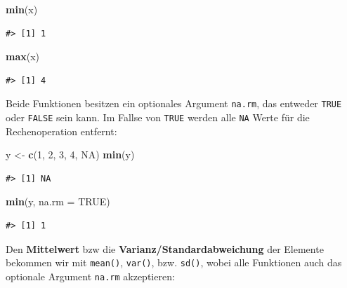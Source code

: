 \documentclass[]{tufte-book}
\newenvironment{Shaded}{}{}
\newcommand{\KeywordTok}[1]{\textcolor[rgb]{0.00,0.44,0.13}{\textbf{#1}}}
\newcommand{\DataTypeTok}[1]{\textcolor[rgb]{0.56,0.13,0.00}{#1}}
\newcommand{\DecValTok}[1]{\textcolor[rgb]{0.25,0.63,0.44}{#1}}
\newcommand{\StringTok}[1]{\textcolor[rgb]{0.25,0.44,0.63}{#1}}
\newcommand{\OtherTok}[1]{\textcolor[rgb]{0.00,0.44,0.13}{#1}}
\newcommand{\NormalTok}[1]{#1}
\begin{document}
\begin{Shaded}
\begin{Highlighting}[]
\KeywordTok{min}\NormalTok{(x)}
\end{Highlighting}
\end{Shaded}

\begin{verbatim}
#> [1] 1
\end{verbatim}

\begin{Shaded}
\begin{Highlighting}[]
\KeywordTok{max}\NormalTok{(x)}
\end{Highlighting}
\end{Shaded}

\begin{verbatim}
#> [1] 4
\end{verbatim}

Beide Funktionen besitzen ein optionales Argument \texttt{na.rm}, das
entweder \texttt{TRUE} oder \texttt{FALSE} sein kann. Im Fallse von
\texttt{TRUE} werden alle \texttt{NA} Werte für die Rechenoperation
entfernt:

\begin{Shaded}
\begin{Highlighting}[]
\NormalTok{y <-}\StringTok{ }\KeywordTok{c}\NormalTok{(}\DecValTok{1}\NormalTok{, }\DecValTok{2}\NormalTok{, }\DecValTok{3}\NormalTok{, }\DecValTok{4}\NormalTok{, }\OtherTok{NA}\NormalTok{)}
\KeywordTok{min}\NormalTok{(y)}
\end{Highlighting}
\end{Shaded}

\begin{verbatim}
#> [1] NA
\end{verbatim}

\begin{Shaded}
\begin{Highlighting}[]
\KeywordTok{min}\NormalTok{(y, }\DataTypeTok{na.rm =} \OtherTok{TRUE}\NormalTok{)}
\end{Highlighting}
\end{Shaded}

\begin{verbatim}
#> [1] 1
\end{verbatim}

Den \textbf{Mittelwert} bzw die \textbf{Varianz/Standardabweichung} der
Elemente bekommen wir mit \texttt{mean()}, \texttt{var()}, bzw.
\texttt{sd()}, wobei alle Funktionen auch das optionale Argument
\texttt{na.rm} akzeptieren:
\end{document}
